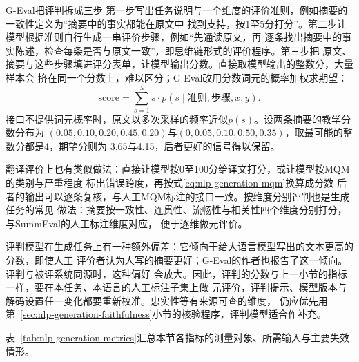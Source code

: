G-Eval把评判拆成三步
第一步写出任务说明与一个维度的评价准则，例如摘要的一致性定义为“摘要中的事实都能在原文中
找到支持，按1至5分打分”。第二步让模型根据准则自行生成一串评价步骤，例如“先通读原文，再
逐条找出摘要中的事实陈述，检查每条是否与原文一致”，即思维链形式的评价程序。第三步把
原文、摘要与这些步骤填进评分表单，让模型输出分数。直接取模型输出的整数分，大量样本会
挤在同一个分数上，难以区分；G-Eval改用分数词元的概率加权求期望：
\begin{equation}
  \mathrm{score}=\sum_{s=1}^{5}s\cdot p(s\mid\text{准则},\text{步骤},x,y).
  \label{eq:nlp-generation-geval}
\end{equation}
接口不提供词元概率时，原文以多次采样的频率近似$p(s)$。设两条摘要的教学分数分布为
$(0.05,0.10,0.20,0.45,0.20)$与$(0,0.05,0.10,0.50,0.35)$，取最可能的整数分都是4，期望分则为
3.65与4.15，后者更好的信号得以保留。

翻译评价上也有类似做法：直接让模型按0至100分给译文打分，或让模型按MQM的类别与严重程度
标出错误跨度，再按式\eqref{eq:nlp-generation-mqm}换算成分数
后者的输出可以逐条复核，与人工MQM标注的接口一致。按维度分别评判也是生成任务的常见
做法：摘要按一致性、连贯性、流畅性与相关性四个维度分别打分，与SummEval的人工标注维度对应，
便于逐维做元评价。

评判模型在生成任务上有一种额外偏差：它倾向于给大语言模型写出的文本更高的分数，即使人工
评价者认为人写的摘要更好；G-Eval的作者也报告了这一倾向。评判与被评系统同源时，这种偏好
会放大。因此，评判的分数与上一小节的指标一样，要在本任务、本语言的人工标注子集上做
元评价，评判提示、模型版本与解码设置任一变化都要重新校准。忠实性等有来源可查的维度，
仍应优先用第~\ref{sec:nlp-generation-faithfulness}小节的核验程序，评判模型适合作补充。

表~\ref{tab:nlp-generation-metrics}汇总本节各指标的测量对象、所需输入与主要失效情形。

